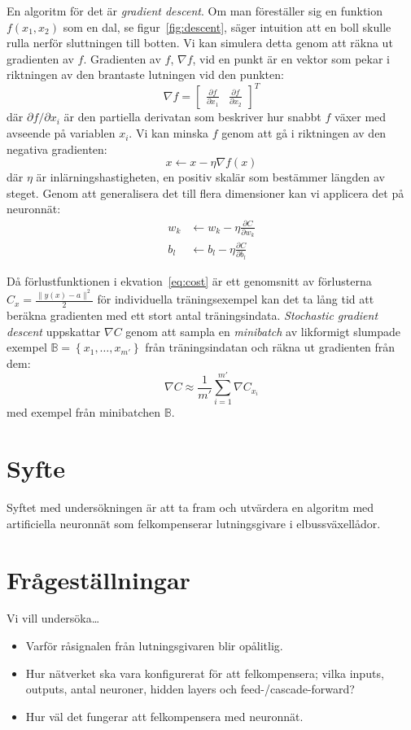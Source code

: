 En algoritm för det är \emph{gradient descent}.
Om man föreställer sig en funktion $ f(x_1, x_2) $ som en dal,
se figur~\ref{fig:descent},
säger intuition att en boll skulle rulla nerför sluttningen till botten.
Vi kan simulera detta genom att räkna ut gradienten av $ f $.
Gradienten av $ f $, $ \nabla f $, vid en punkt är en vektor
som pekar i riktningen av den brantaste lutningen vid den punkten:
\begin{equation}
	\nabla f = \begin{bmatrix} \frac{\partial f}{\partial x_1} & \frac{\partial f}{\partial x_2} \end{bmatrix}^{T}
\end{equation}
där $ \partial f / \partial x_i $ är den partiella derivatan
som beskriver hur snabbt $ f $ växer med avseende på variablen $ x_i $.
Vi kan minska $ f $ genom att gå i riktningen av den negativa gradienten:
\begin{equation}
	x \leftarrow x - \eta \nabla f(x)
\end{equation}
där $ \eta $ är inlärningshastigheten,
en positiv skalär som bestämmer längden av steget.
Genom att generalisera det till flera dimensioner kan vi
applicera det på neuronnät:
\begin{align}
	w_k &\leftarrow w_k - \eta \frac{\partial C}{\partial w_k} \\
	b_l &\leftarrow b_l - \eta \frac{\partial C}{\partial b_l}
\end{align}

Då förlustfunktionen i ekvation~\eqref{eq:cost} är ett genomsnitt av
förlusterna $ C_x = \frac{\lVert y(x) - a \rVert^2}{2} $ för individuella träningsexempel
kan det ta lång tid att beräkna gradienten med ett stort antal träningsindata.
\emph{Stochastic gradient descent} uppskattar $ \nabla C $ genom att
sampla en \emph{minibatch} av likformigt slumpade exempel
$ \mathbb{B} = \left\{ x_1, \dotsc, x_{m'} \right\} $ från träningsindatan
och räkna ut gradienten från dem:
\begin{equation}
	\nabla C \approx \frac{1}{m'} \sum^{m'}_{i=1} \nabla C_{x_i}
\end{equation}
med exempel från minibatchen $ \mathbb{B} $.

\section{Syfte}
Syftet med undersökningen är att ta fram och utvärdera en algoritm med
artificiella neuronnät som felkompenserar lutningsgivare i elbussväxellådor.

\section{Frågeställningar}
Vi vill undersöka\ldots
\begin{itemize}
	\item Varför råsignalen från lutningsgivaren blir opålitlig.
	\item Hur nätverket ska vara konfigurerat för att felkompensera; vilka inputs,
		outputs, antal neuroner, hidden layers och feed-/cascade-forward?
	\item Hur väl det fungerar att felkompensera med neuronnät.
\end{itemize}
